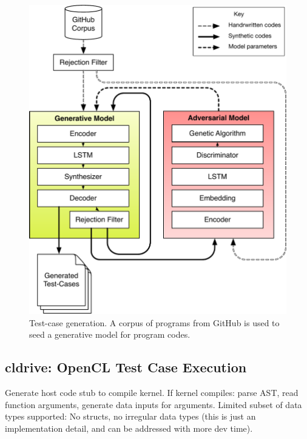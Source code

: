 \begin{figure}
  \centering
  \includegraphics[width=.95\columnwidth]{img/clgen} %
  \caption{%
    Test-case generation. A corpus of programs from GitHub is used to seed a generative model for program codes.%
  }%
  \label{fig:deeptune}
\end{figure}

\subsection{cldrive: OpenCL Test Case Execution}

Generate host code stub to compile kernel. If kernel compiles: parse AST, read function arguments, generate data inputs for arguments. Limited subset of data types supported: No structs, no irregular data types (this is just an implementation detail, and can be addressed with more dev time).
